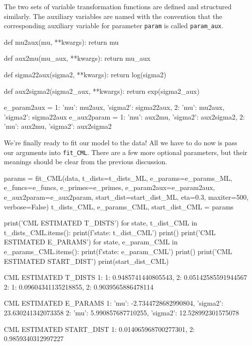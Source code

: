 The two sets of variable transformation functions are defined and structured similarly. The auxiliary variables are named with the convention that the corresponding auxiliary variable for parameter \texttt{param} is called \texttt{param\_aux}.

\begin{NotebookIn}
def mu2aux(mu, **kwargs):
    return mu


def aux2mu(mu_aux, **kwargs):
    return mu_aux


def sigma22aux(sigma2, **kwargs):
    return log(sigma2)


def aux2sigma2(sigma2_aux, **kwargs):
    return exp(sigma2_aux)


e_param2aux = {1: {'mu': mu2aux, 'sigma2': sigma22aux},
               2: {'mu': mu2aux, 'sigma2': sigma22aux}}
e_aux2param = {1: {'mu': aux2mu, 'sigma2': aux2sigma2},
               2: {'mu': aux2mu, 'sigma2': aux2sigma2}}
\end{NotebookIn}

We're finally ready to fit our model to the data! All we have to do now is pass our arguments into \texttt{fit\_CML}. There are a few more optional parameters, but their meanings should be clear from the previous discussion.

\begin{NotebookIn}
params = fit_CML(data,
                 t_dists=t_dists_ML,
                 e_params=e_params_ML, e_funcs=e_funcs, e_primes=e_primes,
                 e_param2aux=e_param2aux, e_aux2param=e_aux2param,
                 start_dist=start_dist_ML, eta=0.3, maxiter=500, verbose=False)
t_dists_CML, e_params_CML, start_dist_CML = params

print('CML ESTIMATED T_DISTS')
for state, t_dist_CML in t_dists_CML.items():
    print(f'{state}: {t_dist_CML}')
print()
print('CML ESTIMATED E_PARAMS')
for state, e_param_CML in e_params_CML.items():
    print(f'{state}: {e_param_CML}')
print()
print('CML ESTIMATED START_DIST')
print(start_dist_CML)
\end{NotebookIn}

\begin{NotebookOut}
CML ESTIMATED T_DISTS
1: {1: 0.9485741440805543, 2: 0.05142585591944567}
2: {1: 0.09604341135218855, 2: 0.9039565886478114}

CML ESTIMATED E_PARAMS
1: {'mu': -2.7344728682990804, 'sigma2': 23.630241342073358}
2: {'mu': 5.990857687710255, 'sigma2': 12.528992301575078}

CML ESTIMATED START_DIST
{1: 0.014065968700277301, 2: 0.9859340312997227}
\end{NotebookOut}

